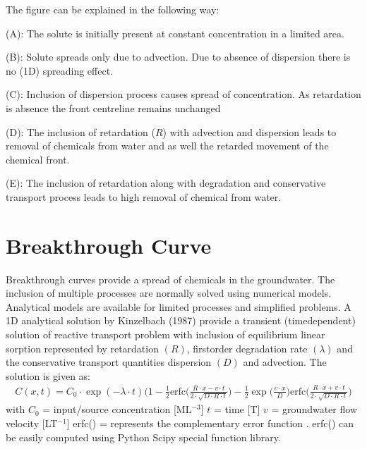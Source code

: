 \documentclass[letterpaper,10pt,english]{jupyterBook}
\begin{document}
\sphinxAtStartPar
The figure can be explained in the following way:

\sphinxAtStartPar
(A): The solute is initially present at constant concentration in a limited area.

\sphinxAtStartPar
(B): Solute spreads only due to advection. Due to absence of dispersion there is no (1D) spreading effect.

\sphinxAtStartPar
(C): Inclusion of dispersion process causes spread of concentration. As retardation is absence the front centreline remains unchanged

\sphinxAtStartPar
(D): The inclusion of retardation (\(R\)) with advection and dispersion leads to removal of chemicals from water and as well the retarded movement of the chemical front.

\sphinxAtStartPar
(E): The inclusion of retardation along with degradation and conservative transport process leads to high removal of chemical from water.


\section{Breakthrough Curve}
\label{\detokenize{content/transport/L10/22_reactive_transport:breakthrough-curve}}
\sphinxAtStartPar
Breakthrough curves provide a  spread of chemicals in the groundwater. The inclusion of multiple processes are normally solved using numerical models. Analytical models are available for limited processes and simplified problems. A 1\sphinxhyphen{}D analytical solution by Kinzelbach (1987) provide a transient (time\sphinxhyphen{}dependent) solution of reactive transport problem with inclusion of equilibrium linear sorption represented by retardation \((R)\), first\sphinxhyphen{}order degradation rate \((\lambda)\) and the conservative transport quantities \sphinxhyphen{} dispersion \((D)\) and advection. The solution is given as:
\begin{equation*}
\begin{split}
C(x,t) = C_0 \cdot \exp(-\lambda\cdot t)\bigg(1- \frac{1}{2}\text{erfc}\bigg(\frac{R\cdot x - v\cdot t}{2\cdot\sqrt{D\cdot R \cdot t}}\bigg) - \frac{1}{2}\exp\bigg(\frac{v\cdot x}{D}\bigg)\text{erfc}\bigg(\frac{R\cdot x + v\cdot t}{2\cdot\sqrt{D\cdot R \cdot t}}\bigg) 
\end{split}
\end{equation*}
\sphinxAtStartPar
with \(C_0\) = input/source concentration {[}ML\(^{-3}\){]} 
\(t\) = time {[}T{]}
\(v\) = groundwater flow velocity {[}LT\(^{-1}\){]}
erfc() = represents the complementary error function . erfc() can be easily computed using Python Scipy special function library.
\end{document}
